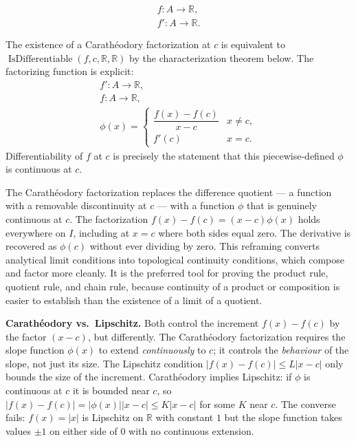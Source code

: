 \begin{remark*}
\[
\begin{aligned}
  f\colon A\to\mathbb{R},\\
  f'\colon A\to\mathbb{R}.
\end{aligned}
\]

The existence of a Carath\'{e}odory factorization at $c$ is equivalent to $\operatorname{IsDifferentiable}(f,c,\mathbb{R},\mathbb{R})$ by the characterization theorem below. The factorizing function is explicit:
\[
\begin{aligned}
  f'\colon A\to\mathbb{R},\\
  f\colon A\to\mathbb{R},\\
\phi(x) =
\begin{cases}
\dfrac{f(x)-f(c)}{x-c} & x \neq c, \\[6pt]
f'(c) & x = c.
\end{cases}
\end{aligned}
\]
Differentiability of $f$ at $c$ is precisely the statement that this piecewise-defined $\phi$ is continuous at $c$.
\end{remark*}

\begin{remark*}[Interpretation]
The Carath\'{e}odory factorization replaces the difference quotient --- a function with a removable discontinuity at $c$ --- with a function $\phi$ that is genuinely continuous at $c$. The factorization $f(x)-f(c) = (x-c)\phi(x)$ holds everywhere on $I$, including at $x=c$ where both sides equal zero. The derivative is recovered as $\phi(c)$ without ever dividing by zero. This reframing converts analytical limit conditions into topological continuity conditions, which compose and factor more cleanly. It is the preferred tool for proving the product rule, quotient rule, and chain rule, because continuity of a product or composition is easier to establish than the existence of a limit of a quotient.

\medskip
\textbf{Carath\'{e}odory vs.\ Lipschitz.} Both control the increment $f(x)-f(c)$ by the factor $(x-c)$, but differently. The Carath\'{e}odory factorization requires the slope function $\phi(x)$ to extend \emph{continuously} to $c$; it controls the \emph{behaviour} of the slope, not just its size. The Lipschitz condition $|f(x)-f(c)| \leq L|x-c|$ only bounds the size of the increment. Carath\'{e}odory implies Lipschitz: if $\phi$ is continuous at $c$ it is bounded near $c$, so $|f(x)-f(c)| = |\phi(x)||x-c| \leq K|x-c|$ for some $K$ near $c$. The converse fails: $f(x)=|x|$ is Lipschitz on $\mathbb{R}$ with constant $1$ but the slope function takes values $\pm 1$ on either side of $0$ with no continuous extension.
\end{remark*}

